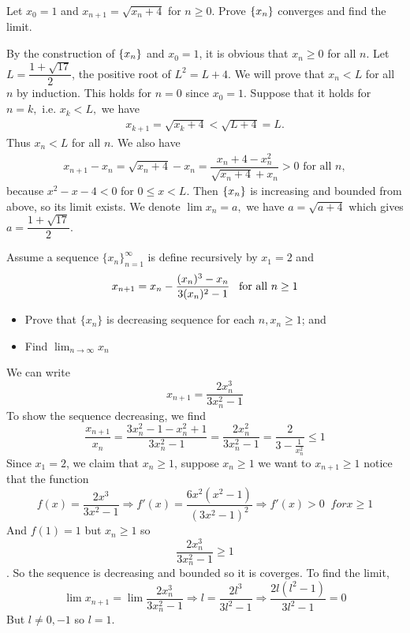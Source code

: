 \begin{problem}
Let $x_0=1$ and $x_{n+1}=\sqrt{x_n+4}$ for $n\ge 0.$ Prove $\left\{ x_n\right\}$ converges and find the limit.
\begin{solution}
By the construction of $\left\{ x_n\right\}$ and $x_0=1$, it is obvious that $x_n\ge 0$ for all $n.$ Let $L=\dfrac{1+\sqrt{17}}{2}$, the positive root of $L^2=L+4$. We will prove that $x_n< L$ for all $n$ by induction. This holds for $n=0$ since $x_0=1$. Suppose that it holds for $n=k,$ i.e. $x_k< L,$ we have 
\begin{align*}
    x_{k+1}=\sqrt{x_k+4}< \sqrt{L+4}= L.
\end{align*}
Thus $x_n< L$ for all $n.$ We also have 
\begin{align*}
    x_{n+1}-x_n=\sqrt{x_n+4}-x_n=\dfrac{x_n+4-x_n^2}{\sqrt{x_n+4}+x_n}>0\text{ for all }n,
\end{align*}
because $x^2-x-4<0$ for $0\le x<L$. Then $\left\{ x_n\right\}$ is increasing and bounded from above, so its limit exists. We denote $\lim x_n=a,$ we have $a=\sqrt{a+4}$ which gives $a=\dfrac{1+\sqrt{17}}{2}.$
\end{solution}
\end{problem}

\begin{problem}
Assume a sequence $\{x_n\}_{n=1}^\infty$ is define recursively by $x_1 = 2 $ and 
    \[x_{n+1} = x_n - \frac{(x_n)^3-x_n}{3(x_n)^2-1}\;\;\; \textup{for all } n\geq 1\]
    \begin{itemize}
        \item[(a)] Prove that $\{x_n\}$ is decreasing sequence for each $n,x_n\geq 1$; and
        \item[(b)] Find $\lim_{n\to \infty} x_n$
    \end{itemize}
\begin{solution}
We can write \[x_{n+1} = \frac{2x_n^3}{3x_n^2-1}\]
    To show the sequence decreasing, we find 
    \[\frac{x_{n+1}}{x_n} = \frac{3x_n^2-1 - x_n^2 +1 }{3x_n^2 -1} = \frac{2x_n^2}{3x_n^2-1} = \frac{2}{3 - \frac1{x_n^2}}\leq 1\]
    Since $x_1=2$, we claim that $x_n\geq 1$, suppose $x_{n}\geq 1$ we want to $x_{n+1}\geq 1$ notice that the function
    \[f(x) = \frac{2x^3}{3x^2-1}\Rightarrow f'(x) = \frac{6x^2(x^2-1)}{(3x^2-1)^2}\Rightarrow f'(x) >0\;\; for x\geq 1\]
    And $f(1)=1$ but $x_n\geq 1$ so 
    \[\frac{2x^3_n}{3x_n^2-1}\geq 1\]. So the sequence is decreasing and bounded so it is coverges. To find the limit, 
    \[\lim x_{n+1} = \lim \frac{2x_n^3}{3x_n^2-1}\Rightarrow l = \frac{2l^3}{3l^2-1}\Rightarrow \frac{2l(l^2-1)}{3l^2-1}=0\]
    But $l\ne 0, -1$ so $l=1$.
\end{solution}
\end{problem}

